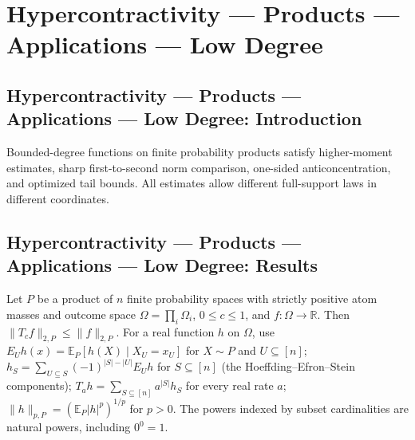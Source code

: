 \section{Hypercontractivity --- Products --- Applications --- Low Degree}
\subsection*{Hypercontractivity --- Products --- Applications --- Low Degree: Introduction}
Bounded-degree functions on finite probability products satisfy higher-moment estimates, sharp first-to-second norm comparison, one-sided anticoncentration, and optimized tail bounds. All estimates allow different full-support laws in different coordinates.

\subsection*{Hypercontractivity --- Products --- Applications --- Low Degree: Results}

\begin{theorem}
\leanok
{}
Let $P$ be a product of $n$ finite probability spaces with strictly positive atom masses and outcome space $\Omega=\prod_i\Omega_i$, $0\le c\le1$, and $f:\Omega\to\mathbb R$. Then $\|T_cf\|_{2,P}\le\|f\|_{2,P}$. For a real function $h$ on $\Omega$, use $E_Uh(x)=\mathbb E_P[h(X)\mid X_U=x_U]$ for $X\sim P$ and $U\subseteq[n]$; $h_S=\sum_{U\subseteq S}(-1)^{|S|-|U|}E_Uh$ for $S\subseteq[n]$ (the Hoeffding--Efron--Stein components); $T_a h=\sum_{S\subseteq[n]}a^{|S|}h_S$ for every real rate $a$; $\|h\|_{p,P}=(\mathbb E_P|h|^p)^{1/p}$ for $p>0$. The powers indexed by subset cardinalities are natural powers, including $0^0=1$.
\end{theorem}

